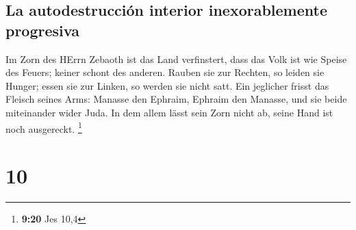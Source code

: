 \hypertarget{la-autodestrucciuxf3n-interior-inexorablemente-progresiva}{%
\subsection{La autodestrucción interior inexorablemente
progresiva}\label{la-autodestrucciuxf3n-interior-inexorablemente-progresiva}}

 Im Zorn des HErrn Zebaoth ist das Land verfinstert, dass
das Volk ist wie Speise des Feuers; keiner schont des anderen.
 Rauben sie zur Rechten, so leiden sie Hunger; essen sie
zur Linken, so werden sie nicht satt. Ein jeglicher frisst das Fleisch
seines Arms:  Manasse den Ephraim, Ephraim den Manasse,
und sie beide miteinander wider Juda. In dem allem lässt sein Zorn nicht
ab, seine Hand ist noch ausgereckt. \footnote{\textbf{9:20} Jes 10,4}

\hypertarget{section-9}{%
\section{10}\label{section-9}}

